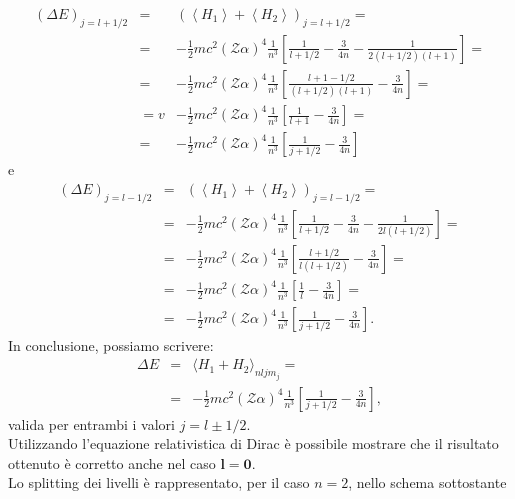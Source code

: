 \begin{eqnarray} 
\left( \Delta E \right)_{j=l+1/2} &= & \left( \left< H_1\right> +\left<H_2 \right>  \right)_{j=l+1/2}= \nonumber \\
& =& -\frac{1}{2} mc^2 \left( \mathcal{Z}\alpha \right)^4 \frac{1}{n^3} \left[ \frac{1}{l+1/2}-\frac{3}{4n}-\frac{1}{2(l+1/2)(l+1)}\right]=  \nonumber \\
& = & -\frac{1}{2} mc^2 \left( \mathcal{Z}\alpha \right)^4 \frac{1}{n^3} \left[ \frac{l+1-1/2}{(l+1/2)(l+1)}-\frac{3}{4n}\right]= \nonumber  \\
& =v& -\frac{1}{2} mc^2 \left( \mathcal{Z}\alpha \right)^4 \frac{1}{n^3} \left[ \frac{1}{l+1}-\frac{3}{4n} \right]= \nonumber \\
& = &-\frac{1}{2} mc^2 \left( \mathcal{Z}\alpha \right)^4 \frac{1}{n^3} \left[ \frac{1}{j+1/2}-\frac{3}{4n} \right]
\end{eqnarray}
e
\begin{eqnarray} 
 \left( \Delta E \right)_{j=l-1/2}&=&\left( \left< H_1\right> +\left<H_2 \right>  \right)_{j=l-1/2}= \nonumber \\
& = &-\frac{1}{2} mc^2 \left( \mathcal{Z}\alpha \right)^4 \frac{1}{n^3} \left[ \frac{1}{l+1/2}-\frac{3}{4n}-\frac{1}{2l(l+1/2)}\right]= \nonumber \\
& =& -\frac{1}{2} mc^2 \left( \mathcal{Z}\alpha \right)^4 \frac{1}{n^3} \left[ \frac{l+1/2}{l(l+1/2)}-\frac{3}{4n}\right]= \nonumber \\
& = &-\frac{1}{2} mc^2 \left( \mathcal{Z}\alpha \right)^4 \frac{1}{n^3} \left[ \frac{1}{l}-\frac{3}{4n} \right]= \nonumber  \\
& = & -\frac{1}{2} mc^2 \left( \mathcal{Z}\alpha \right)^4 \frac{1}{n^3} \left[ \frac{1}{j+1/2}-\frac{3}{4n} \right] .
\end{eqnarray}
In conclusione, possiamo scrivere:
\begin{eqnarray}
\Delta E &=& \langle H_1+H_2 \rangle_{nljm_j}= \nonumber\\
& = &-\frac{1}{2}mc^2 \left( \mathcal{Z}\alpha \right)^4 \frac{1}{n^3} \left[ \frac{1}{j+1/2}-\frac{3}{4n}\right] ,
\end{eqnarray}
valida per entrambi i valori $j=l\pm1/2$. \\
Utilizzando l'equazione relativistica di Dirac è possibile mostrare che il risultato ottenuto è corretto anche nel caso \textbf{$\boldsymbol{l=0}$}. \\
Lo splitting dei livelli è rappresentato, per il caso $n=2$, nello schema sottostante\\
